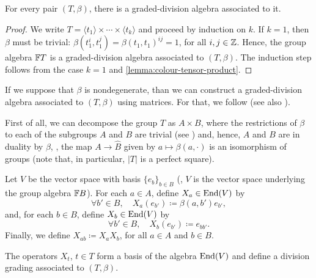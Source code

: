 \begin{prop}
    For every pair $(T, \beta)$, there is a graded-division algebra associated to it. 
\end{prop}

\begin{proof}
    We write $T = \langle t_1 \rangle \times \cdots \times \langle t_k \rangle$ and proceed by induction on $k$. 
    If $k = 1$, then $\beta$ must be trivial: $\beta(t_1^i,t_1^j) = \beta(t_1, t_1)^{ij} = 1$, for all $i, j \in \mathbb{Z}$. 
    Hence, the group algebra $\mathbb{F} T$ is a graded-division algebra associated to $(T, \beta)$. 
    The induction step follows from the case $k=1$ and \cref{lemma:colour-tensor-product}.
\end{proof}

If we suppose that $\beta$ is nondegenerate, than we can construct a graded-division algebra associated to $(T,\beta)$ using matrices. 
For that, we follow \cite[Remark 18]{EK15} (see also \cite[Remark 2.16]{livromicha}).

First of all, we can decompose the group $T$ as $A\times B$, where the restrictions of $\beta$ to each of the subgroups $A$ and $B$ are trivial (see \cite[page 36]{livromicha}) and, hence, $A$ and $B$ are in duality by $\beta$, \ie, the map $A \to \widehat B$ given by $a \mapsto \beta(a, \cdot)$ is an isomorphism of groups (note that, in particular, $|T|$ is a perfect square). 

Let $V$ be the vector space with basis $\{e_b\}_{b\in B}$ (\ie, $V$ is the vector space underlying the group algebra $\mathbb{F} B$). 
For each $a\in A$, define $X_a\in \operatorname{End}(V)$ by
\[
    \forall b' \in B, \quad X_a (e_{b'}) \coloneqq \beta(a, b')e_{b'},
\]
and, for each $b\in B$, define $X_b\in \operatorname{End}(V)$ by
\[
    \forall b' \in B, \quad X_b (e_{b'}) \coloneqq e_{bb'}.
\]
Finally, we define $X_{ab} \coloneqq X_a X_b$, for all $a\in A$ and $b\in B$. 

\begin{prop}
    The operators $X_t$, $t\in T$ form a basis of the algebra $\operatorname{End}(V)$ and define a division grading associated to $(T, \beta)$. 
\end{prop}

